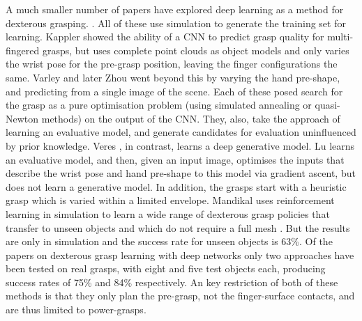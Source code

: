 A much smaller number of papers have explored deep learning as a method for dexterous grasping. \cite{lu2017planning,varley2015generating,veres2017modeling,zhou20176dof,kappler2015leveraging}. All of these use simulation to generate the training set for learning. Kappler \cite{kappler2015leveraging} showed the ability of a CNN to predict grasp quality for multi-fingered grasps, but uses complete point clouds as object models and only varies the wrist pose for the pre-grasp position, leaving the finger configurations the same. Varley \cite{varley2015generating} and later Zhou \cite{zhou20176dof} went beyond this by varying the hand pre-shape, and predicting from a single image of the scene. Each of these posed search for the grasp as a pure optimisation problem (using simulated annealing or quasi-Newton methods) on the output of the CNN. They, also, take the approach of learning an evaluative model, and generate candidates for evaluation uninfluenced by prior knowledge. Veres \cite{veres2017modeling}, in contrast, learns a deep generative model. Lu \cite{lu2017planning} learns an evaluative model, and then, given an input image, optimises the inputs that describe the wrist pose and hand pre-shape to this model via gradient ascent, but does not learn a generative model. In addition, the grasps start with a heuristic grasp which is varied within a limited envelope. Mandikal uses reinforcement learning in simulation to learn a wide range of dexterous grasp policies that transfer to unseen objects and which do not require a full mesh \cite{mandikal2021dexterous}. But the results are only in simulation and the success rate for unseen objects is 63\%. Of the papers on dexterous grasp learning with deep networks only two approaches \cite{varley2015generating,lu2017planning} have been tested on real grasps, with eight and five test objects each, producing success rates of 75\% and 84\% respectively. An key restriction of both of these methods is that they only plan the pre-grasp, not the finger-surface contacts, and are thus limited to power-grasps.

